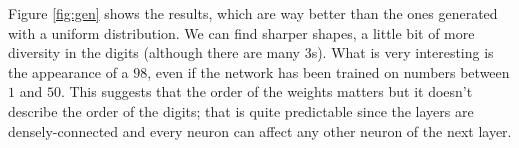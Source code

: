 \documentclass[compsoc]{IEEEtran}
\begin{document}
Figure \ref{fig:gen} shows the results, which are way better than the ones generated with a uniform distribution. We can find sharper shapes, a little bit of more
diversity in the digits (although there are many $3$s). What is very interesting is the appearance of a $98$, even if the network has been trained on numbers between $1$ and $50$. This suggests that the order of the weights matters but it doesn't describe the order of the digits; that is quite predictable since the layers are densely-connected and every neuron can affect any other neuron of the next layer.
\end{document}

